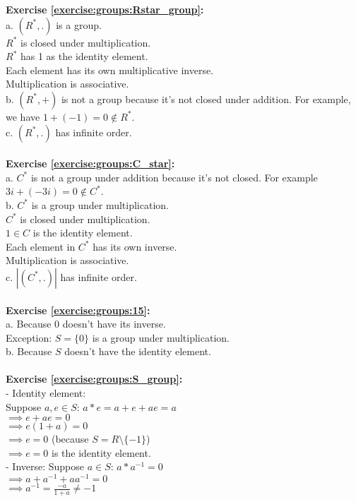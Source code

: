 \noindent\textbf{Exercise \ref{exercise:groups:Rstar_group}:}\\
a. $(R^*,.)$ is a group.\\
$R^*$ is closed under multiplication.\\
$R^*$ has 1 as the identity element.\\
Each element has its own multiplicative inverse.\\
Multiplication is associative.\\
b. $(R^*,+)$ is not a group because it's not closed under addition. For example, we have $1+(-1)=0\not\in R^*$.\\
c. $(R^*,.)$ has infinite order.\\
\\
\textbf{Exercise \ref{exercise:groups:C_star}:}\\
a. $C^*$ is not a group under addition because it's not closed. For example $3i+(-3i)=0\not\in C^*$.\\
b. $C^*$ is a group under multiplication.\\
$C^*$ is closed under multiplication.\\
$1\in C$ is the identity element.\\
Each element in $C^*$ has its own inverse.\\
Multiplication is associative.\\
c. $|(C^*,.)|$ has infinite order.\\
\\
\textbf{Exercise \ref{exercise:groups:15}:}\\
a. Because 0 doesn't have its inverse.\\
Exception: $S=\{0\}$ is a group under multiplication.\\
b. Because $S$ doesn't have the identity element.\\
\\
\textbf{Exercise \ref{exercise:groups:S_group}:}\\
- Identity element:\\
Suppose $a,e\in S$: $a*e=a+e+ae=a$\\
$\implies e+ae=0$\\
$\implies e(1+a)=0$\\
$\implies e=0$ (because $S=R\setminus\{-1\}$)\\
$\implies e=0$ is the identity element.\\
- Inverse: Suppose $a\in S$: $a*a^{-1}=0$\\
$\implies a+a^{-1}+aa^{-1}=0$\\
$\implies a^{-1}=\displaystyle\frac{-a}{1+a}\neq -1$\\
